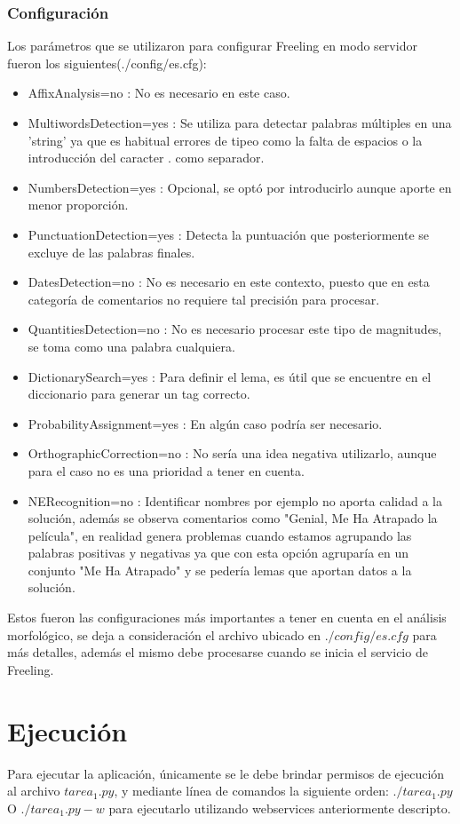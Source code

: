 \documentclass[12pt]{article}
\begin{document}
\subsubsection{Configuración}\label{configFree}
Los parámetros que se utilizaron para configurar Freeling en modo servidor fueron los siguientes(./config/es.cfg):
\begin{itemize}
\item AffixAnalysis=no : No es necesario en este caso.
\item MultiwordsDetection=yes : Se utiliza para detectar palabras múltiples en una 'string' ya que es habitual errores de tipeo como la falta de espacios o la introducción del caracter $.$ como separador.
\item NumbersDetection=yes : Opcional, se optó por introducirlo aunque aporte en menor proporción.
\item PunctuationDetection=yes : Detecta la puntuación que posteriormente se excluye de las palabras finales.
\item DatesDetection=no : No es necesario en este contexto, puesto que en esta categoría de comentarios no requiere tal precisión para procesar.
\item QuantitiesDetection=no : No es necesario procesar este tipo de magnitudes, se toma como una palabra cualquiera. 
\item DictionarySearch=yes : Para definir el lema, es útil que se encuentre en el diccionario para generar un tag correcto.
\item ProbabilityAssignment=yes : En algún caso podría ser necesario.
\item OrthographicCorrection=no : No sería una idea negativa utilizarlo, aunque para el caso no es una prioridad a tener en cuenta.
\item NERecognition=no : Identificar nombres por ejemplo no aporta calidad a la solución, además se observa comentarios como "Genial, Me Ha Atrapado la película", en realidad genera problemas cuando estamos agrupando las palabras positivas y negativas ya que con esta opción agruparía en un conjunto "Me Ha Atrapado" y se pedería lemas que aportan datos a la solución.
\end{itemize}
Estos fueron las configuraciones más importantes a tener en cuenta en el análisis morfológico, se deja a consideración el archivo ubicado en $./config/es.cfg$ para más detalles, además el mismo debe procesarse cuando se inicia el servicio de Freeling.

\section{Ejecución}
Para ejecutar la aplicación, únicamente se le debe brindar permisos de ejecución al archivo $tarea_1.py$, y mediante línea de comandos la siguiente orden:
$./tarea_1.py$
O $./tarea_1.py -w$ para ejecutarlo utilizando webservices anteriormente descripto.
\end{document}
